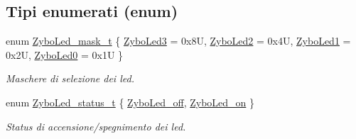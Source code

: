 \subsection*{Tipi enumerati (enum)}
\begin{DoxyCompactItemize}
\item 
enum \hyperlink{group___led_gad11701cccac394f7e1f90de8f85695f3}{Zybo\+Led\+\_\+mask\+\_\+t} \{ \hyperlink{group___led_ggad11701cccac394f7e1f90de8f85695f3adc5edc2adfd899da9f149cb61364b141}{Zybo\+Led3} = 0x8\+U, 
\hyperlink{group___led_ggad11701cccac394f7e1f90de8f85695f3a4fa521f6fce7c4ba77d1d8144e71cdfc}{Zybo\+Led2} = 0x4\+U, 
\hyperlink{group___led_ggad11701cccac394f7e1f90de8f85695f3ad71c06f65dfffcf825d48f287718d9be}{Zybo\+Led1} = 0x2\+U, 
\hyperlink{group___led_ggad11701cccac394f7e1f90de8f85695f3ae1a1e8fa0bf803793ff27004884b85fe}{Zybo\+Led0} = 0x1\+U
 \}
\begin{DoxyCompactList}\small\item\em Maschere di selezione dei led. \end{DoxyCompactList}\item 
enum \hyperlink{group___led_ga3dcb274f22e577705c49944b8d1f4b12}{Zybo\+Led\+\_\+status\+\_\+t} \{ \hyperlink{group___led_gga3dcb274f22e577705c49944b8d1f4b12a9679f1c302afdb51915a2331b4ec92f3}{Zybo\+Led\+\_\+off}, 
\hyperlink{group___led_gga3dcb274f22e577705c49944b8d1f4b12aafcf0ae16a6edec807c06bb0a99f7e8b}{Zybo\+Led\+\_\+on}
 \}
\begin{DoxyCompactList}\small\item\em Status di accensione/spegnimento dei led. \end{DoxyCompactList}\end{DoxyCompactItemize}
